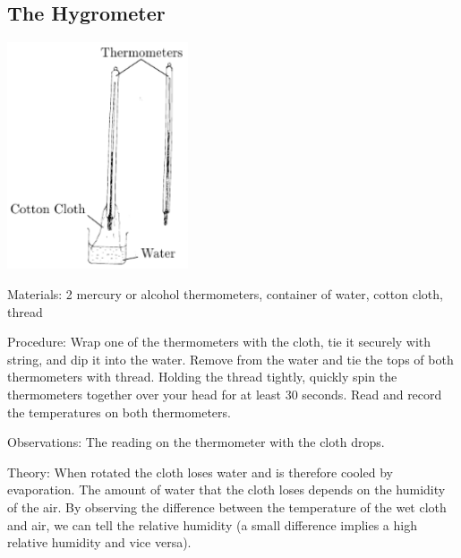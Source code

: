 \begin{multicols}{2}

\subsection{The Hygrometer} 

\begin{center}
\includegraphics[width=0.4\textwidth]{./img/hygrometer.png}
\end{center}

\begin{description*}
\item[Materials:]{2 mercury or alcohol thermometers, container of water, cotton cloth, thread}
\item[Procedure:]{Wrap one of the thermometers with the cloth, tie it securely with string, and dip it into the water. Remove from the water and tie the tops of both thermometers with thread. Holding the thread tightly, quickly spin the thermometers together over your head for at least 30 seconds. Read and record the temperatures on both thermometers.}
\item[Observations:]{The reading on the thermometer with the cloth drops.}
\item[Theory:]{When rotated the cloth loses water and is therefore cooled by evaporation. The amount of water that the cloth loses depends on the humidity of the air. By observing the difference between the temperature of the wet cloth and air, we can tell the relative humidity (a small difference implies a high relative humidity and vice versa).}
\end{description*}



\end{multicols}

\pagebreak